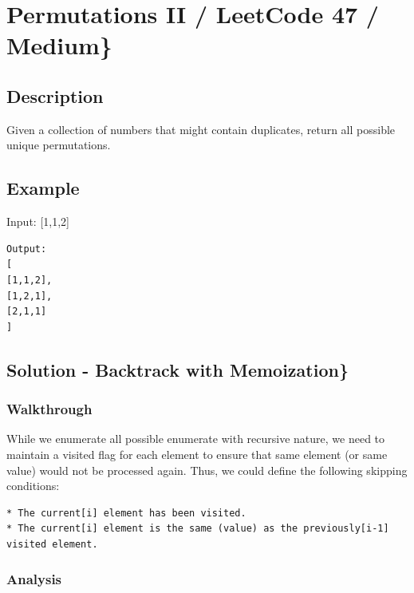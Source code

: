 \documentclass[]{book}
\begin{document}
\hypertarget{permutations-ii-leetcode-47-medium}{%
\section{Permutations II / LeetCode 47 / Medium\}}\label{permutations-ii-leetcode-47-medium}}

\hypertarget{description-15}{%
\subsection{Description}\label{description-15}}

Given a collection of numbers that might contain duplicates, return all possible unique permutations.

\hypertarget{example-14}{%
\subsection{Example}\label{example-14}}

Input: {[}1,1,2{]}

\begin{verbatim}
Output:
[
[1,1,2],
[1,2,1],
[2,1,1]
]
\end{verbatim}

\hypertarget{solution---backtrack-with-memoization-1}{%
\subsection{Solution - Backtrack with Memoization\}}\label{solution---backtrack-with-memoization-1}}

\hypertarget{walkthrough-14}{%
\subsubsection{Walkthrough}\label{walkthrough-14}}

While we enumerate all possible enumerate with recursive nature, we need to maintain a visited flag for each element
to ensure that same element (or same value) would not be processed again. Thus, we could define the following skipping
conditions:

\begin{verbatim}
* The current[i] element has been visited.
* The current[i] element is the same (value) as the previously[i-1] visited element.
\end{verbatim}

\hypertarget{analysis-16}{%
\subsubsection{Analysis}\label{analysis-16}}
\end{document}
